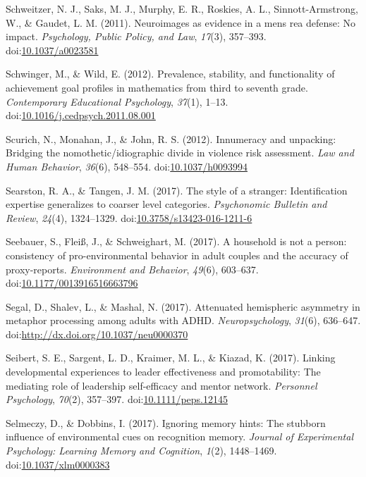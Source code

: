 \documentclass[english,man]{apa6}
\begin{document}
\hypertarget{ref-Schweitzer2011}{}
Schweitzer, N. J., Saks, M. J., Murphy, E. R., Roskies, A. L.,
Sinnott-Armstrong, W., \& Gaudet, L. M. (2011). Neuroimages as evidence
in a mens rea defense: No impact. \emph{Psychology, Public Policy, and
Law}, \emph{17}(3), 357--393.
doi:\href{https://doi.org/10.1037/a0023581}{10.1037/a0023581}

\hypertarget{ref-Schwinger2012}{}
Schwinger, M., \& Wild, E. (2012). Prevalence, stability, and
functionality of achievement goal profiles in mathematics from third to
seventh grade. \emph{Contemporary Educational Psychology}, \emph{37}(1),
1--13.
doi:\href{https://doi.org/10.1016/j.cedpsych.2011.08.001}{10.1016/j.cedpsych.2011.08.001}

\hypertarget{ref-Scurich2012}{}
Scurich, N., Monahan, J., \& John, R. S. (2012). Innumeracy and
unpacking: Bridging the nomothetic/idiographic divide in violence risk
assessment. \emph{Law and Human Behavior}, \emph{36}(6), 548--554.
doi:\href{https://doi.org/10.1037/h0093994}{10.1037/h0093994}

\hypertarget{ref-Searston2016}{}
Searston, R. A., \& Tangen, J. M. (2017). The style of a stranger:
Identification expertise generalizes to coarser level categories.
\emph{Psychonomic Bulletin and Review}, \emph{24}(4), 1324--1329.
doi:\href{https://doi.org/10.3758/s13423-016-1211-6}{10.3758/s13423-016-1211-6}

\hypertarget{ref-Seebauer2017}{}
Seebauer, S., Fleiß, J., \& Schweighart, M. (2017). A household is not a
person: consistency of pro-environmental behavior in adult couples and
the accuracy of proxy-reports. \emph{Environment and Behavior},
\emph{49}(6), 603--637.
doi:\href{https://doi.org/10.1177/0013916516663796}{10.1177/0013916516663796}

\hypertarget{ref-Segal2017}{}
Segal, D., Shalev, L., \& Mashal, N. (2017). Attenuated hemispheric
asymmetry in metaphor processing among adults with ADHD.
\emph{Neuropsychology}, \emph{31}(6), 636--647.
doi:\href{https://doi.org/http://dx.doi.org/10.1037/neu0000370}{http://dx.doi.org/10.1037/neu0000370}

\hypertarget{ref-Seibert2017}{}
Seibert, S. E., Sargent, L. D., Kraimer, M. L., \& Kiazad, K. (2017).
Linking developmental experiences to leader effectiveness and
promotability: The mediating role of leadership self-efficacy and mentor
network. \emph{Personnel Psychology}, \emph{70}(2), 357--397.
doi:\href{https://doi.org/10.1111/peps.12145}{10.1111/peps.12145}

\hypertarget{ref-Selmeczy2017}{}
Selmeczy, D., \& Dobbins, I. (2017). Ignoring memory hints: The stubborn
influence of environmental cues on recognition memory. \emph{Journal of
Experimental Psychology: Learning Memory and Cognition}, \emph{1}(2),
1448--1469.
doi:\href{https://doi.org/10.1037/xlm0000383}{10.1037/xlm0000383}
\end{document}
